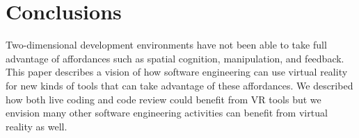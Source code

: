 \documentclass[conference]{IEEEtran}
\begin{document}
\section{Conclusions}

Two-dimensional development environments have not been able to take full advantage of affordances such as spatial cognition, manipulation, and feedback.
This paper describes a vision of how software engineering can use virtual reality for new kinds of tools that can take advantage of these affordances.
We described how both live coding and code review could benefit from VR tools but we envision many other software engineering activities can benefit from virtual reality as well.





\end{document}
